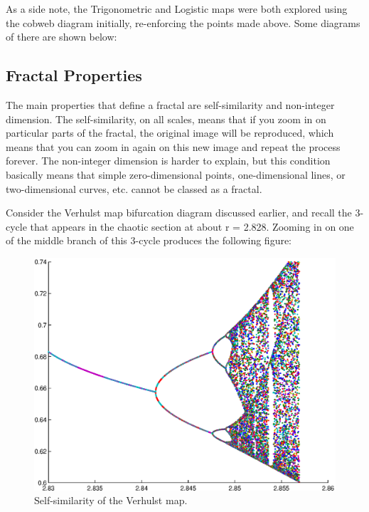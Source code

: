 \documentclass[a4wide, 10pt]{article}
\begin{document}
As a side note, the Trigonometric and Logistic maps were both explored using the cobweb
 diagram initially, re-enforcing the points made above. Some diagrams of there are shown below:
 
\subsection{Fractal Properties}

The main properties that define a fractal are self-similarity and non-integer dimension\cite{Fractal Properties}. The self-similarity, on all scales, means that if you zoom in on particular parts of the fractal, the original image will be reproduced, which means that you can zoom in again on this new image and repeat the process forever. The non-integer dimension is harder to explain, but this condition basically means that simple zero-dimensional points, one-dimensional lines, or two-dimensional curves, etc. cannot be classed as a fractal. 

Consider the Verhulst map bifurcation diagram discussed earlier, and recall the 3-cycle that appears in the chaotic section at about r = 2.828. Zooming in on one of the middle branch of this 3-cycle produces the following figure: 

\begin{figure}[H]

    \centering

    \includegraphics[scale=0.25]{EPSFiles/VerhulstFractal}

    \caption{Self-similarity of the Verhulst map.}

\end{figure} 
\end{document}
